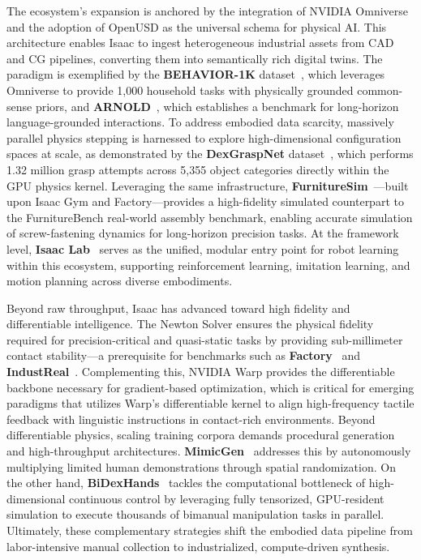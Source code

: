 \documentclass[acmsmall,screen,review,anonymous]{acmart}
\begin{document}
The ecosystem's expansion is anchored by the integration of NVIDIA Omniverse and the adoption of OpenUSD as the universal schema for physical AI\@. This architecture enables Isaac to ingest heterogeneous industrial assets from CAD and CG pipelines, converting them into semantically rich digital twins. The paradigm is exemplified by the \textbf{BEHAVIOR-1K} dataset~\cite{li2024behavior}, which leverages Omniverse to provide 1,000 household tasks with physically grounded common-sense priors, and \textbf{ARNOLD}~\cite{gong2023arnold}, which establishes a benchmark for long-horizon language-grounded interactions. To address embodied data scarcity, massively parallel physics stepping is harnessed to explore high-dimensional configuration spaces at scale, as demonstrated by the \textbf{DexGraspNet} dataset~\cite{wang2023dexgraspnetlargescaleroboticdexterous}, which performs 1.32 million grasp attempts across 5,355 object categories directly within the GPU physics kernel. Leveraging the same infrastructure, \textbf{FurnitureSim}~\cite{heo2023furniturebench}---built upon Isaac Gym and Factory---provides a high-fidelity simulated counterpart to the FurnitureBench real-world assembly benchmark, enabling accurate simulation of screw-fastening dynamics for long-horizon precision tasks. At the framework level, \textbf{Isaac Lab}~\cite{mittal2023orbit} serves as the unified, modular entry point for robot learning within this ecosystem, supporting reinforcement learning, imitation learning, and motion planning across diverse embodiments.

Beyond raw throughput, Isaac has advanced toward high fidelity and differentiable intelligence. The Newton Solver ensures the physical fidelity required for precision-critical and quasi-static tasks by providing sub-millimeter contact stability---a prerequisite for benchmarks such as \textbf{Factory}~\cite{narang2022factory} and \textbf{IndustReal}~\cite{schoonbeek2024industreal}. 
Complementing this, NVIDIA Warp provides the differentiable backbone necessary for gradient-based optimization, which is critical for emerging paradigms that utilizes Warp's differentiable kernel to align high-frequency tactile feedback with linguistic instructions in contact-rich environments.
Beyond differentiable physics, scaling training corpora demands procedural generation and high-throughput architectures. 
\textbf{MimicGen}~\cite{mandlekar2023mimicgen} addresses this by autonomously multiplying limited human demonstrations through spatial randomization. 
On the other hand, \textbf{BiDexHands}~\cite{chen2022bidexhands} tackles the computational bottleneck of high-dimensional continuous control by leveraging fully tensorized, GPU-resident simulation to execute thousands of bimanual manipulation tasks in parallel. 
Ultimately, these complementary strategies shift the embodied data pipeline from labor-intensive manual collection to industrialized, compute-driven synthesis.
\end{document}
